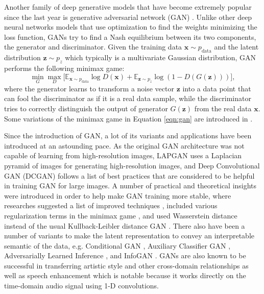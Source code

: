 Another family of deep generative models that have become extremely popular since the last year is generative adversarial network (GAN) \cite{goodfellow2014gan}.
Unlike other deep neural networks models that use optimization to find the weights minimizing the loss function, GANs try to find a Nash equilibrium between its two components, the generator and discriminator.
Given the training data $\mathbf{x}\sim p_{\mathrm{data}}$ and the latent distribution $\mathbf{z} \sim p_z$ which typically is a multivariate Gaussian distribution, GAN performs the following minimax game:
\begin{equation}\label{eqn:gan}
	\min_{G} \max_{D} \Big[ \mathbb{E}_{\mathbf{x} \sim p_{\mathrm{data}}} {\log D(\mathbf{x})} + \mathbb{E}_{\mathbf{z} \sim p_z} \log \left ( 1 - D(G(\mathbf{z})) \right ) \Big],
\end{equation}
where the generator learns to transform a noise vector $\mathbf{z}$ into a data point that can fool the discriminator as if it is a real data sample, while the discriminator tries to correctly distinguish the output of generator $G(\mathbf{z})$ from the real data $\mathbf{x}$.
Some variations of the minimax game in Equation \ref{eqn:gan} are introduced in \cite{goodfellow2016gan}.

Since the introduction of GAN, a lot of its variants and applications have been introduced at an astounding pace.
As the original GAN architecture was not capable of learning from high-resolution images, LAPGAN \cite{denton2015lapgan} uses a Laplacian pyramid of images for generating high-resolution images, and Deep Convolutional GAN (DCGAN) \cite{radford2015dcgan} follows a list of best practices that are considered to be helpful in training GAN for large images.
A number of practical and theoretical insights were introduced in order to help make GAN training more stable, where researches suggested a list of improved techniques \cite{salimans2016improved}, included various regularization terms in the minimax game \cite{che2016mrgan}, and used Wasserstein distance instead of the usual Kullback-Leibler distance GAN \cite{arjovsky2017wgan,berthelot2017began}.
There also have been a number of variants to make the latent representation to convey an interpretable semantic of the data, e.g. Conditional GAN \cite{mirza2014conditional}, Auxiliary Classifier GAN \cite{odena2016acgan}, Adversarially Learned Inference \cite{dumoulin2017ali}, and InfoGAN \cite{chen2016infogan}.
GANs are also known to be successful in transferring artistic style \cite{zhu2017cyclegan} and other cross-domain relationships \cite{kim2017discogan} as well as speech enhancement \cite{pascual2017segan} which is notable because it works directly on the time-domain audio signal using 1-D convolutions.

